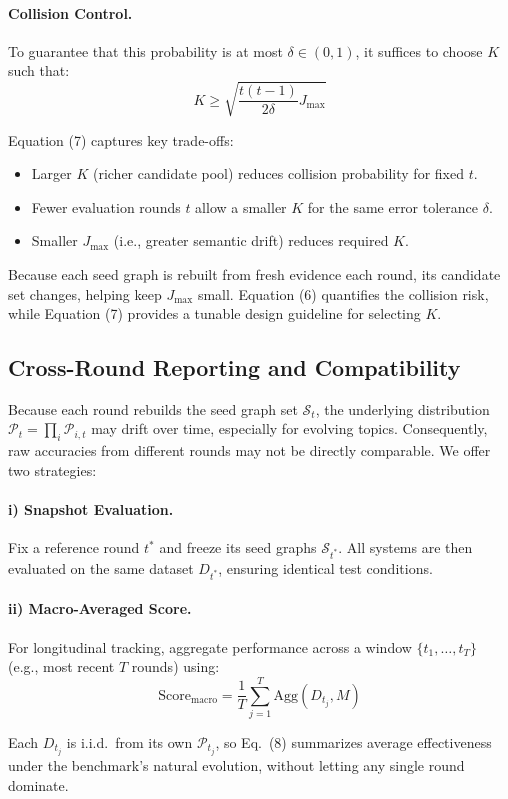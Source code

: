 \paragraph{Collision Control.} To guarantee that this probability is at most $\delta \in (0,1)$, it suffices to choose $K$ such that:
\begin{equation}
    K \geq \sqrt{ \frac{t(t-1)}{2\delta} J_{\max} }
\end{equation}

Equation (7) captures key trade-offs:
\begin{itemize}
    \item Larger $K$ (richer candidate pool) reduces collision probability for fixed $t$.
    \item Fewer evaluation rounds $t$ allow a smaller $K$ for the same error tolerance $\delta$.
    \item Smaller $J_{\max}$ (i.e., greater semantic drift) reduces required $K$.
\end{itemize}

Because each seed graph is rebuilt from fresh evidence each round, its candidate set changes, helping keep $J_{\max}$ small. Equation (6) quantifies the collision risk, while Equation (7) provides a tunable design guideline for selecting $K$.

\subsection{Cross-Round Reporting and Compatibility}

Because each round rebuilds the seed graph set $\mathcal{S}_t$, the underlying distribution 
$\mathcal{P}_t = \prod_i \mathcal{P}_{i,t}$ may drift over time, especially for evolving topics. Consequently, raw accuracies from different rounds may not be directly comparable. We offer two strategies:

\paragraph{i) Snapshot Evaluation.} Fix a reference round $t^\ast$ and freeze its seed graphs $\mathcal{S}_{t^\ast}$. All systems are then evaluated on the same dataset $D_{t^\ast}$, ensuring identical test conditions.

\paragraph{ii) Macro-Averaged Score.} For longitudinal tracking, aggregate performance across a window $\{t_1, \ldots, t_T\}$ (e.g., most recent $T$ rounds) using:
\begin{equation}
    \text{Score}_{\text{macro}} = \frac{1}{T} \sum_{j=1}^{T} \text{Agg}(D_{t_j}, M)
\end{equation}

Each $D_{t_j}$ is i.i.d.\ from its own $\mathcal{P}_{t_j}$, so Eq.\ (8) summarizes average effectiveness under the benchmark’s natural evolution, without letting any single round dominate.

